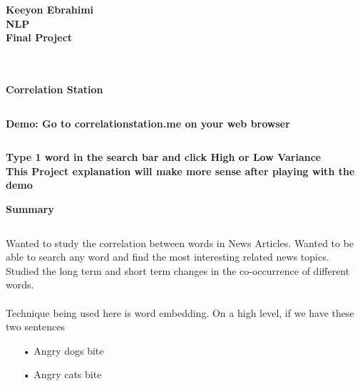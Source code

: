 \documentclass[ruled]{article}
\begin{document}
\textbf{Keeyon Ebrahimi}\\
\textbf{NLP}\\
\textbf{Final Project}\\ \\ \\

\begin{center}
{\Large \textbf{Correlation Station} }
\begin{verbatim}

\end{verbatim}
\textbf{Demo: Go to correlationstation.me on your web browser}
\begin{verbatim}

\end{verbatim}
\textbf{Type 1 word in the search bar and click High or Low Variance }
\\
\textbf{This Project explanation will make more sense after playing with the demo}
\end{center}

\noindent\makebox[\linewidth]{\rule{\paperwidth}{0.4pt}}
\begin{center}
{\Large \textbf{Summary} }
\end{center}
\begin{verbatim}

\end{verbatim}
Wanted to study the correlation between words in News Articles.  Wanted to be able to search any word and find the most interesting related news topics.  Studied the long term and short term changes in the co-occurrence of different words.
\\ \\
Technique being used here is word embedding.  On a high level, if we have these two sentences \\
\begin{itemize}
\item[•] Angry dogs bite
\item[•] Angry cats bite
\end{itemize}
\end{document}
